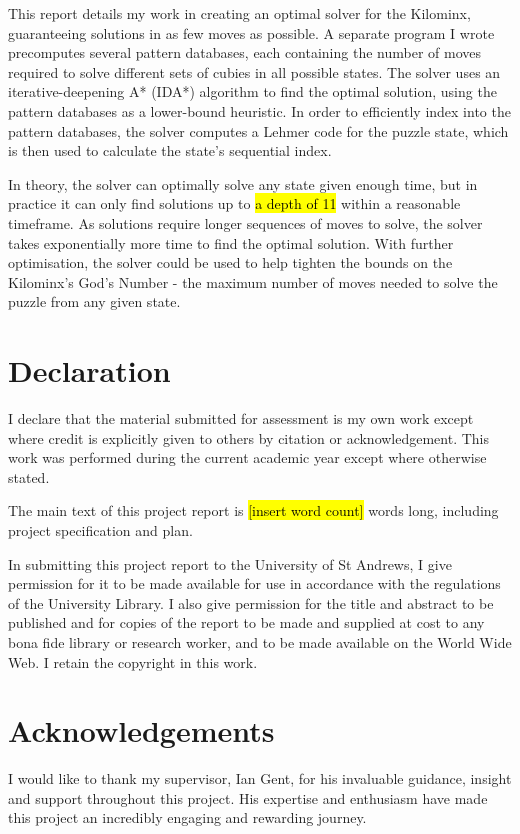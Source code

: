 \documentclass[12pt]{report}
\newcommand{\hlc}[2][yellow]{{%
    \colorlet{foo}{#1}%
    \sethlcolor{foo}\hl{#2}}%
}
\begin{document}
This report details my work in creating an optimal solver for the Kilominx, guaranteeing solutions in as few moves as possible. A separate program I wrote precomputes several pattern databases, each containing the number of moves required to solve different sets of cubies in all possible states. The solver uses an iterative-deepening A* (IDA*) algorithm to find the optimal solution, using the pattern databases as a lower-bound heuristic. In order to efficiently index into the pattern databases, the solver computes a Lehmer code for the puzzle state, which is then used to calculate the state's sequential index.

In theory, the solver can optimally solve any state given enough time, but in practice it can only find solutions up to \hlc[yellow]{a depth of 11} within a reasonable timeframe. As solutions require longer sequences of moves to solve, the solver takes exponentially more time to find the optimal solution. With further optimisation, the solver could be used to help tighten the bounds on the Kilominx's God's Number - the maximum number of moves needed to solve the puzzle from any given state.

\chapter*{Declaration}
I declare that the material submitted for assessment is my own work except where credit is explicitly given to others by citation or acknowledgement. This work was performed during the current academic year except where otherwise stated.

The main text of this project report is \hlc[yellow]{[insert word count]} words long, including project specification and plan.

In submitting this project report to the University of St Andrews, I give permission for it to be made available for use in accordance with the regulations of the University Library. I also give permission for the title and abstract to be published and for copies of the report to be made and supplied at cost to any bona fide library or research worker, and to be made available on the World Wide Web. I retain the copyright in this work.

\chapter*{Acknowledgements}
I would like to thank my supervisor, Ian Gent, for his invaluable guidance, insight and support throughout this project. His expertise and enthusiasm have made this project an incredibly engaging and rewarding journey.
\end{document}
